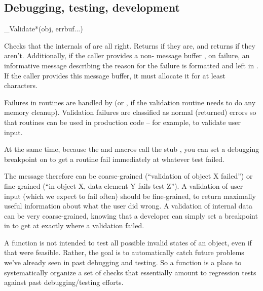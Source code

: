 \subsection{Debugging, testing, development}

\begin{sreapi}
\hypertarget{ifc:Validate}
{\item[\_Validate*(obj, errbuf...)]}

Checks that the internals of  are all right. Returns
 if they are, and returns  if they
aren't. Additionally, if the caller provides a non-
message buffer , on failure, an informative message
describing the reason for the failure is formatted and left in
. If the caller provides this message buffer, it must
allocate it for at least  characters.

Failures in  routines are handled by
 (or , if the validation
routine needs to do any memory cleanup).  Validation failures are
classified as normal (returned) errors so that 
routines can be used in production code -- for example, to validate
user input.

At the same time, because the  and
 macros call the stub , you can
set a debugging breakpoint on  to get a
 routine fail immediately at whatever test
failed. 

The  message therefore can be coarse-grained
(``validation of object X failed'') or fine-grained (``in object X,
data element Y fails test Z''). A validation of user input (which we
expect to fail often) should be fine-grained, to return maximally
useful information about what the user did wrong. A validation of
internal data can be very coarse-grained, knowing that a developer can
simply set a breakpoint in  to get at exactly where
a validation failed.

A  function is not intended to test all possible
invalid states of an object, even if that were feasible. Rather, the
goal is to automatically catch future problems we've already seen in
past debugging and testing. So a  function is a
place to systematically organize a set of checks that essentially
amount to regression tests against past debugging/testing efforts.


\end{sreapi}
